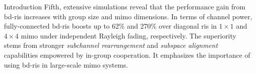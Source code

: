 \documentclass[journal]{IEEEtran}
\begin{document}
\begin{section}{Introduction}
	Fifth, extensive simulations reveal that the performance gain from \gls{bd}-\gls{ris} increases with group size and \gls{mimo} dimensions.
	In terms of channel power, fully-connected \gls{bd}-\gls{ris} boosts up to 62\% and 270\% over diagonal \gls{ris} in $1 \times 1$ and $4 \times 4$ \gls{mimo} under independent Rayleigh fading, respectively.
	The superiority stems from stronger \emph{subchannel rearrangement} and \emph{subspace alignment} capabilities empowered by in-group cooperation.
	It emphasizes the importance of using \gls{bd}-\gls{ris} in large-scale \gls{mimo} systems.






\end{section}
\end{document}
